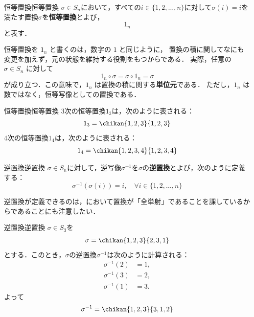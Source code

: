 \begin{definition}{恒等置換}{恒等置換}
  $\sigma\in S_n$において，すべての$i \in \{1, 2, \dots, n\}$に対して$\sigma(i) = i$を満たす置換$\sigma$を\textbf{恒等置換}とよび，
  \[
  1_n
  \]
  と表す．
\end{definition}


恒等置換を $1_n$ と書くのは，数字の $1$ と同じように，
置換の積に関してなにも変更を加えず，元の状態を維持する役割をもつからである．
実際，任意の $\sigma\in S_n$ に対して
\[
1_n\circ\sigma=\sigma\circ 1_n=\sigma
\]
が成り立つ．この意味で，$1_n$ は置換の積に関する\textbf{単位元}である．
ただし，$1_n$ は数ではなく，恒等写像としての置換である．


\begin{example}{恒等置換}{恒等置換}
  $3$次の恒等置換$1_3$は，次のように表される：
  \[
  1_3 = \chikan{1, 2, 3}{1, 2, 3}
  \]
  $4$次の恒等置換$1_4$は，次のように表される：
  \[
  1_4 = \chikan{1, 2, 3, 4}{1, 2, 3, 4}
  \]
\end{example}

\begin{definition}{逆置換}{逆置換}
  $\sigma\in S_n$に対して，逆写像$\sigma^{-1}$を$\sigma$の\textbf{逆置換}とよび，次のように定義する：
  \[
  \sigma^{-1}(\sigma(i)) = i, \quad \forall i \in \{1, 2, \dots, n\}
  \]
\end{definition}

逆置換が定義できるのは，において置換が「全単射」であることを課しているからであることにも注意したい．

\begin{example}{逆置換}{逆置換}
  $\sigma \in S_3$を
  \[
  \sigma = \chikan{1, 2, 3}{2, 3, 1}
  \]
  とする．このとき，$\sigma$の逆置換$\sigma^{-1}$は次のように計算される：
  \begin{align*}
    \sigma^{-1}(2) &= 1, \\
    \sigma^{-1}(3) &= 2, \\
    \sigma^{-1}(1) &= 3.
  \end{align*}
  よって
  \[
  \sigma^{-1} = \chikan{1, 2, 3}{3, 1, 2}
  \]
\end{example}


